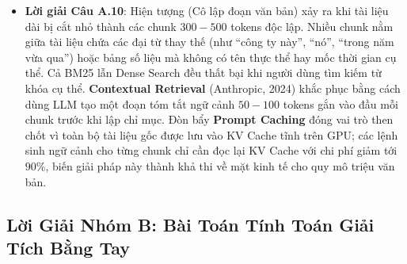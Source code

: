 \begin{itemize}
  \item \textbf{Lời giải Câu A.10}:
  Hiện tượng  (Cô lập đoạn văn bản) xảy ra khi tài liệu dài bị cắt nhỏ thành các chunk $300 - 500$ tokens độc lập. Nhiều chunk nằm giữa tài liệu chứa các đại từ thay thế (như ``công ty này'', ``nó'', ``trong năm vừa qua'') hoặc bảng số liệu mà không có tên thực thể hay mốc thời gian cụ thể. Cả BM25 lẫn Dense Search đều thất bại khi người dùng tìm kiếm từ khóa cụ thể.
  \textbf{Contextual Retrieval} (Anthropic, 2024) khắc phục bằng cách dùng LLM tạo một đoạn tóm tắt ngữ cảnh $50 - 100$ tokens gắn vào đầu mỗi chunk trước khi lập chỉ mục. Đòn bẩy \textbf{Prompt Caching} đóng vai trò then chốt vì toàn bộ tài liệu gốc được lưu vào KV Cache tĩnh trên GPU; các lệnh sinh ngữ cảnh cho từng chunk chỉ cần đọc lại KV Cache với chi phí giảm tới $90\%$, biến giải pháp này thành khả thi về mặt kinh tế cho quy mô triệu văn bản.
\end{itemize}

\subsection{Lời Giải Nhóm B: Bài Toán Tính Toán Giải Tích Bằng Tay}

